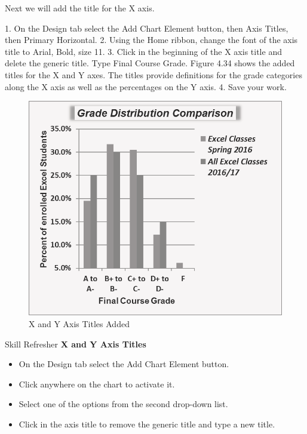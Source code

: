 Next we will add the title for the X axis.

1. On the Design tab select the Add Chart Element button, then Axis Titles, then Primary
Horizontal.
2. Using the Home ribbon, change the font of the axis title to Arial, Bold, size 11.
3. Click in the beginning of the X axis title and delete the generic title. Type Final Course Grade.
Figure 4.34 shows the added titles for the X and Y axes. The titles provide definitions for the
grade categories along the X axis as well as the percentages on the Y axis.
4. Save your work.

\begin{figure}[H]
	\centering
	\includegraphics[width=\maxwidth{.95\linewidth}]{gfx/ch04_fig35}
	\caption{X and Y Axis Titles Added}
	\label{04:fig35}
\end{figure}

\begin{center}
	\begin{sklbox}{Skill Refresher}
		\textbf{X and Y Axis Titles}
		\\
		\begin{itemize}
			\setlength{\itemsep}{0pt}
			\setlength{\parskip}{0pt}
			\setlength{\parsep}{0pt}

			\item On the Design tab select the Add Chart Element button.
			\item Click anywhere on the chart to activate it.
			\item Select one of the options from the second drop-down list.
			\item Click in the axis title to remove the generic title and type a new title.
			
		\end{itemize}
	\end{sklbox}
\end{center}

